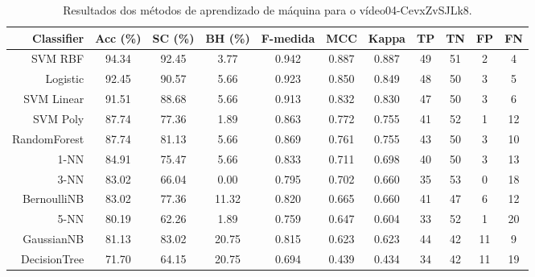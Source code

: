 \begin{table}[!htb]
\centering
\caption{Resultados dos métodos de aprendizado de máquina para o vídeo04-CevxZvSJLk8.}
\label{tab:04-CevxZvSJLk8}
\begin{tabular}{r|c|c|c|c|c|c|c|c|c|c}
\hline\hline
Classifier & Acc (\%) & SC (\%) & BH (\%) & F-medida & MCC & Kappa & TP & TN & FP & FN \\ \hline
SVM RBF & 94.34 & 92.45 & 3.77 & 0.942 & 0.887 & 0.887 & 49 & 51 & 2 & 4 \\ 
Logistic & 92.45 & 90.57 & 5.66 & 0.923 & 0.850 & 0.849 & 48 & 50 & 3 & 5 \\ 
SVM Linear & 91.51 & 88.68 & 5.66 & 0.913 & 0.832 & 0.830 & 47 & 50 & 3 & 6 \\ 
SVM Poly & 87.74 & 77.36 & 1.89 & 0.863 & 0.772 & 0.755 & 41 & 52 & 1 & 12 \\ 
RandomForest & 87.74 & 81.13 & 5.66 & 0.869 & 0.761 & 0.755 & 43 & 50 & 3 & 10 \\ 
1-NN & 84.91 & 75.47 & 5.66 & 0.833 & 0.711 & 0.698 & 40 & 50 & 3 & 13 \\ 
3-NN & 83.02 & 66.04 & 0.00 & 0.795 & 0.702 & 0.660 & 35 & 53 & 0 & 18 \\ 
BernoulliNB & 83.02 & 77.36 & 11.32 & 0.820 & 0.665 & 0.660 & 41 & 47 & 6 & 12 \\ 
5-NN & 80.19 & 62.26 & 1.89 & 0.759 & 0.647 & 0.604 & 33 & 52 & 1 & 20 \\ 
GaussianNB & 81.13 & 83.02 & 20.75 & 0.815 & 0.623 & 0.623 & 44 & 42 & 11 & 9 \\ 
DecisionTree & 71.70 & 64.15 & 20.75 & 0.694 & 0.439 & 0.434 & 34 & 42 & 11 & 19 \\ 
\hline\hline
\end{tabular}
\end{table}
